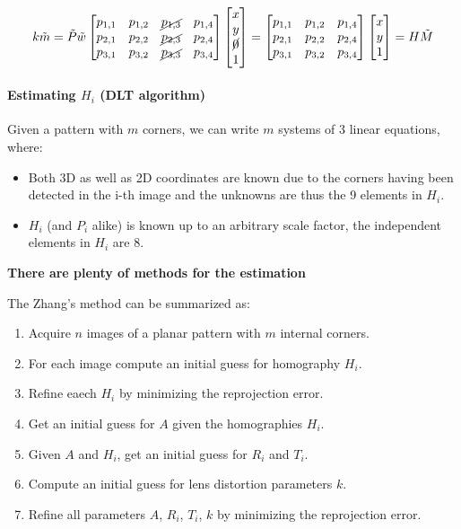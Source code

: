$$k\tilde{m} = \tilde{P}\tilde{w}
\begin{bmatrix}
  p_{1,1} & p_{1,2} & \cancel{p_{1,3}} & p_{1,4} \\
  p_{2,1} & p_{2,2} & \cancel{p_{2,3}} & p_{2,4} \\
  p_{3,1} & p_{3,2} & \cancel{p_{3,3}} & p_{3,4} 
\end{bmatrix}
\begin{bmatrix}
x \\ y \\ \cancel{0} \\ 1
\end{bmatrix}
=
\begin{bmatrix}
  p_{1,1} & p_{1,2} & p_{1,4} \\
  p_{2,1} & p_{2,2} & p_{2,4} \\
  p_{3,1} & p_{3,2} & p_{3,4} 
\end{bmatrix}
\begin{bmatrix}
x \\ y \\ 1
\end{bmatrix}
= H\tilde{M}
$$

\paragraph{Estimating $H_i$ (DLT algorithm)}
Given a pattern with $m$ corners, we can write $m$ systems of 3 linear equations, where:
\begin{itemize}
  \item Both 3D as well as 2D coordinates are known due to the corners having been detected in the i-th image and the unknowns are thus the 9 elements in $H_i$.
  \item $H_i$ (and $P_i$ alike) is known up to an arbitrary scale factor, the independent elements in $H_i$ are 8.
\end{itemize}

\textbf{There are plenty of methods for the estimation}

The Zhang's method can be summarized as:
\begin{enumerate}
  \item Acquire $n$ images of a planar pattern with $m$ internal corners.
  \item For each image compute an initial guess for homography $H_i$.
  \item Refine eaech $H_i$ by minimizing the reprojection error.
  \item Get an initial guess for $A$ given the homographies $H_i$.
  \item Given $A$ and $H_i$, get an initial guess for $R_i$ and $T_i$.
  \item Compute an initial guess for lens distortion parameters $k$.
  \item Refine all parameters $A$, $R_i$, $T_i$, $k$ by minimizing the reprojection error.
\end{enumerate}

